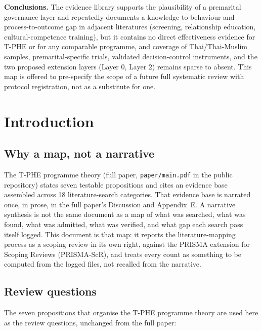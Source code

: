 \documentclass[11pt]{article}
\newcommand{\tphe}{T\mbox{-}PHE}
\begin{document}
\begin{minipage}{\textwidth}
\textbf{Conclusions.} The evidence library supports the plausibility of a premarital governance
layer and repeatedly documents a knowledge-to-behaviour and process-to-outcome gap in adjacent
literatures (screening, relationship education, cultural-competence training), but it contains
no direct effectiveness evidence for \tphe{} or for any comparable programme, and coverage of
Thai/Thai-Muslim samples, premarital-specific trials, validated decision-control instruments, and
the two proposed extension layers (Layer 0, Layer 2) remains sparse to absent. This map is offered
to pre-specify the scope of a future full systematic review with protocol registration, not as a
substitute for one.
\end{minipage}

\vspace{4mm}
\section{Introduction}

\subsection{Why a map, not a narrative}
The \tphe{} programme theory (full paper, \texttt{paper\slash{}main.pdf} in the public repository) states seven testable
propositions and cites an evidence base assembled across 18 literature-search categories. That
evidence base is narrated once, in prose, in the full paper's Discussion and Appendix~E. A
narrative synthesis is not the same document as a map of what was searched, what was found, what
was admitted, what was verified, and what gap each search pass itself logged. This document is
that map: it reports the literature-mapping process as a scoping review in its own right, against
the PRISMA extension for Scoping Reviews (PRISMA-ScR), and treats every count as something to be
computed from the logged files, not recalled from the narrative.

\subsection{Review questions}
The seven propositions that organise the \tphe{} programme theory are used here as the review
questions, unchanged from the full paper:
\end{document}
